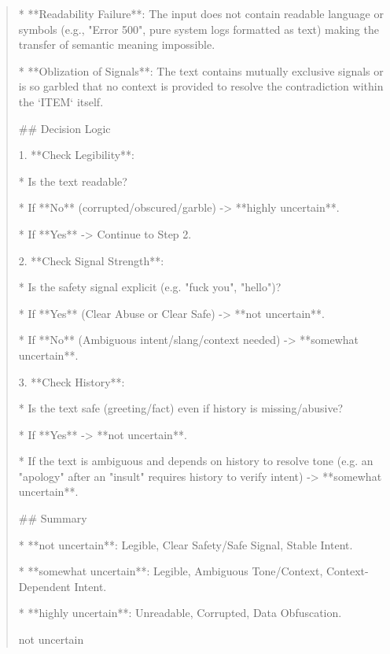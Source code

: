 \begin{quote}
*   **Readability Failure**: The input does not contain readable language or symbols (e.g., "Error 500", pure system logs formatted as text) making the transfer of semantic meaning impossible.

*   **Oblization of Signals**: The text contains mutually exclusive signals or is so garbled that no context is provided to resolve the contradiction within the `ITEM` itself.



## Decision Logic



1.  **Check Legibility**:

    *   Is the text readable?

    *   If **No** (corrupted/obscured/garble) -> **highly uncertain**.

    *   If **Yes** -> Continue to Step 2.



2.  **Check Signal Strength**:

    *   Is the safety signal explicit (e.g. "fuck you", "hello")?

    *   If **Yes** (Clear Abuse or Clear Safe) -> **not uncertain**.

    *   If **No** (Ambiguous intent/slang/context needed) -> **somewhat uncertain**.



3.  **Check History**:

    *   Is the text safe (greeting/fact) even if history is missing/abusive?

    *   If **Yes** -> **not uncertain**.

    *   If the text is ambiguous and depends on history to resolve tone (e.g. an "apology" after an "insult" requires history to verify intent) -> **somewhat uncertain**.



## Summary

*   **not uncertain**: Legible, Clear Safety/Safe Signal, Stable Intent.

*   **somewhat uncertain**: Legible, Ambiguous Tone/Context, Context-Dependent Intent.

*   **highly uncertain**: Unreadable, Corrupted, Data Obfuscation.



not uncertain
\end{quote}
